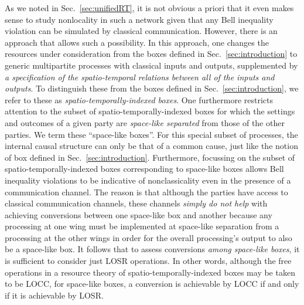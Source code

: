 \documentclass[12pt]{article}
\newcommand{\rob}{\color{black}}
\newcommand{\blk}{\color{black}}
\theoremstyle{plain}
\theoremstyle{definition}
\begin{document}
As we noted in Sec.~\ref{sec:unifiedRT}, it is not obvious a priori that it even makes sense to study nonlocality in such a network given that any Bell inequality violation can be simulated by classical communication. 
\rob However, there is an approach that allows such a possibility.  In this approach, one changes the resources under consideration from the boxes defined in Sec.~\ref{sec:introduction} to generic multipartite processes with classical inputs and outputs, supplemented by {\em a specification of the spatio-temporal relations between all of the inputs and outputs}.  To distinguish these from the boxes defined in Sec.~\ref{sec:introduction}, we refer to these as {\em spatio-temporally-indexed boxes}.  One furthermore restricts attention to the subset of spatio-temporally-indexed boxes
  for which the settings and outcomes of a given party
 are {\em space-like separated} from those of the other parties.  We term these ``space-like boxes''. 
For this special subset of processes,
   the internal causal structure can only be that of a common cause, just like the notion of box defined in Sec.~\ref{sec:introduction}.  
Furthermore, focussing on the subset of spatio-temporally-indexed boxes corresponding to 
space-like boxes allows Bell inequality violations to be indicative of nonclassicality even in the presence of a communication channel.  The reason is that \blk although the parties have access to classical communication channels, these channels {\em simply do not help} with achieving  conversions between one space-like box and another because any processing at one wing must be implemented at space-like separation from a processing at the other wings in order for the overall processing's output to also be a space-like box.   \rob
It follows that to assess conversions {\em among space-like boxes}, it is sufficient to consider just LOSR operations.
 In other words, although the free operations in a resource theory of spatio-temporally-indexed boxes may be taken to be LOCC, 
  for space-like boxes, a conversion is achievable by LOCC
   if and only if it is achievable by LOSR. \blk
\end{document}

